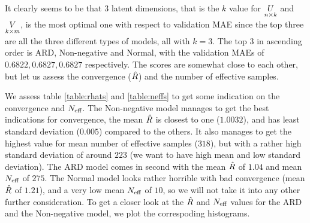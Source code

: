 \documentclass[12pt]{article}
\begin{document}
    It clearly seems to be that $3$ latent dimensions, that is the $k$ value for $\underset{n \times k}{U}$ and $\underset{k \times m}{V}$, is the most optimal one with respect to validation MAE since the top three are all the three different types of models, all with $k=3$. The top 3 in ascending order is ARD, Non-negative and Normal, with the validation MAEs of $0.6822, 0.6827, 0.6827$ respectively. The scores are somewhat close to each other, but let us assess the convergence ($\hat{R}$) and the number of effective samples. 

    \vspace{3mm}
    We assess table \ref{table:rhats} and \ref{table:neffs} to get some indication on the convergence and $N_{\text{eff}}$. The Non-negative model manages to get the best indications for convergence, the mean $\hat{R}$ is closest to one ($1.0032$), and has least standard deviation ($0.005$) compared to the others. It also manages to get the highest value for mean number of effective samples ($318$), but with a rather high standard deviation of around $223$ (we want to have high mean and low standard deviation). The ARD model comes in second with the mean $\hat{R}$ of $1.04$ and mean $N_{\text{eff}}$ of $275$. The Normal model looks rather horrible with bad convergence (mean $\hat{R}$ of $1.21$), and a very low mean $N_{\text{eff}}$ of $10$, so we will not take it into any other further consideration. To get a closer look at the $\hat{R}$ and $N_{\text{eff}}$ values for the ARD and the Non-negative model, we plot the correspoding histograms.
\end{document}
